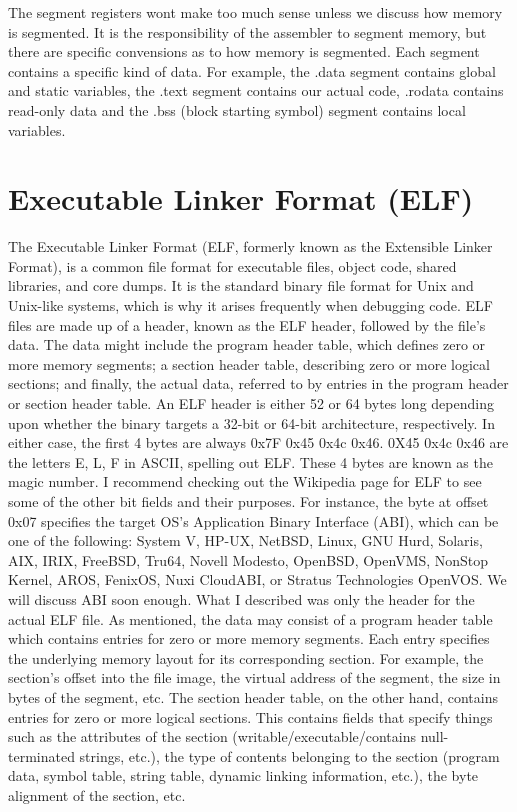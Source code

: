 \documentclass{article}
\begin{document}
	The segment registers wont make too much sense unless we discuss how memory is segmented. It is the responsibility of 
   the assembler to segment memory, but there are specific convensions as to how memory is segmented. Each segment contains a 
   specific kind of data. For example, the .data segment contains global and static variables, the .text segment contains our actual 
   code, .rodata contains read-only data and the .bss (block starting symbol) segment contains local variables. 

\section{Executable Linker Format (ELF)}

	The Executable Linker Format (ELF, formerly known as the Extensible Linker Format), is a common file format for executable files, 
   object code, shared libraries, and core dumps. It is the standard binary file format for Unix and Unix-like systems, which 
   is why it arises frequently when debugging code. ELF files are made up of a header, known as the ELF 
   header, followed by the file’s data. The data might include the program header table, which defines zero or more memory 
   segments; a section header table, describing zero or more logical sections; and finally, the actual data, referred to by entries 
   in the program header or section header table. An ELF header is either 52 or 64 bytes long depending upon 
   whether the binary targets a 32-bit or 64-bit architecture, respectively. In either case, the first 4 bytes are always 0x7F 
   0x45 0x4c 0x46. 0X45 0x4c 0x46 are the letters E, L, F in ASCII, spelling out ELF. These 4 bytes 
   are known as the magic number. I recommend checking out the Wikipedia page for ELF to see some of the 
   other bit fields and their purposes. For instance, the byte at offset 0x07 specifies the target OS’s Application Binary Interface 
   (ABI), which can be one of the following: System V, HP-UX, NetBSD, Linux, GNU Hurd, Solaris, AIX, IRIX, FreeBSD, Tru64, 
   Novell Modesto, OpenBSD, OpenVMS, NonStop Kernel, AROS, FenixOS, Nuxi CloudABI, or Stratus Technologies OpenVOS. We will discuss ABI soon enough. 
   What I described was only the header for the actual ELF file. As mentioned, the data may consist of a 
   program header table which contains entries for zero or more memory segments. Each entry specifies the underlying memory layout for 
   its corresponding section. For example, the section’s offset into the file image, the virtual address of the segment, the size 
   in bytes of the segment, etc. The section header table, on the other hand, contains entries for zero or more 
   logical sections. This contains fields that specify things such as the attributes of the section (writable/executable/contains null-terminated strings, etc.), the 
   type of contents belonging to the section (program data, symbol table, string table, dynamic linking information, etc.), the byte alignment 
   of the section, etc.\\
\end{document}
